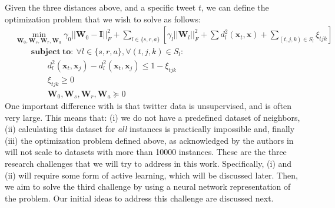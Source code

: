 \documentclass[letterpaper]{article}
\begin{document}
Given the three distances above, and a specific tweet $t$, we can define the optimization problem that we wish to solve as follows: 
{\footnotesize
\begin{align}
&\min_{\mathbf{W}_0, \mathbf{W}_s, \mathbf{W}_r, \mathbf{W}_a} \gamma_0 || \mathbf{W}_0 - \mathbf{I}||^2_F + \sum_{l \in \{s, r, a\}} \left[  \gamma_l || \mathbf{W}_l ||^2_F + \sum d_{l}^2 ( \mathbf{x}_t, \mathbf{x} ) + \sum_{(t,j,k) \in S_l} \xi_{tjk} \right]\\
&\quad \quad \mathbf{subject\ to:}\ \forall l \in \{ s, r, a\}, \forall (t, j, k) \in S_l: \\
& \quad \quad \quad \quad d^2_l ( \mathbf{x}_t,  \mathbf{x}_j) - d^2_l ( \mathbf{x}_t,  \mathbf{x}_j) \leq 1 - \xi_{tjk}\\ 
& \quad \quad \quad \quad \xi_{tjk} \geq 0\\
& \quad \quad \quad \quad \mathbf{W}_0, \mathbf{W}_s, \mathbf{W}_r, \mathbf{W}_a \succeq	0
\end{align}
}
One important difference with \cite{Parameswaran2010a} is that twitter data is unsupervised, and is often very large. This means that: (i) we do not have a predefined dataset of neighbors, (ii) calculating this dataset for \emph{all} instances is practically impossible and, finally (iii) the optimization problem defined above, as acknowledged by the authors in \cite{Parameswaran2010a} will not scale to datasets with more than 10000 instances.  These are the three research challenges that we will try to address in this work. Specifically, (i) and (ii) will require some form of active learning, which will be discussed later. Then, we aim to solve the third challenge by using a neural network representation of the problem. Our initial ideas to address this challenge are discussed next.


\end{document}
